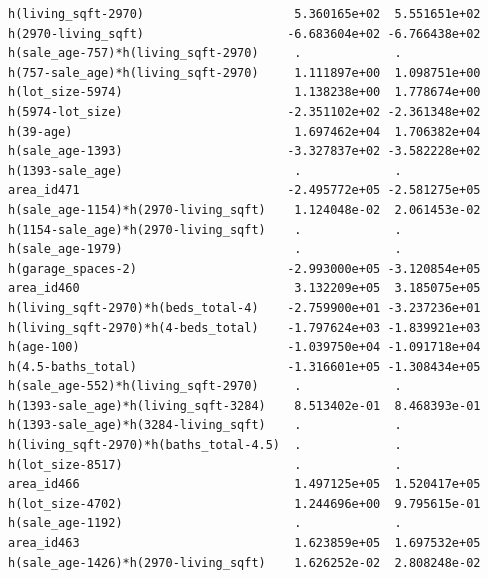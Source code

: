 \documentclass[
]{article}
\begin{document}
\begin{verbatim}
h(living_sqft-2970)                     5.360165e+02  5.551651e+02
h(2970-living_sqft)                    -6.683604e+02 -6.766438e+02
h(sale_age-757)*h(living_sqft-2970)     .             .           
h(757-sale_age)*h(living_sqft-2970)     1.111897e+00  1.098751e+00
h(lot_size-5974)                        1.138238e+00  1.778674e+00
h(5974-lot_size)                       -2.351102e+02 -2.361348e+02
h(39-age)                               1.697462e+04  1.706382e+04
h(sale_age-1393)                       -3.327837e+02 -3.582228e+02
h(1393-sale_age)                        .             .           
area_id471                             -2.495772e+05 -2.581275e+05
h(sale_age-1154)*h(2970-living_sqft)    1.124048e-02  2.061453e-02
h(1154-sale_age)*h(2970-living_sqft)    .             .           
h(sale_age-1979)                        .             .           
h(garage_spaces-2)                     -2.993000e+05 -3.120854e+05
area_id460                              3.132209e+05  3.185075e+05
h(living_sqft-2970)*h(beds_total-4)    -2.759900e+01 -3.237236e+01
h(living_sqft-2970)*h(4-beds_total)    -1.797624e+03 -1.839921e+03
h(age-100)                             -1.039750e+04 -1.091718e+04
h(4.5-baths_total)                     -1.316601e+05 -1.308434e+05
h(sale_age-552)*h(living_sqft-2970)     .             .           
h(1393-sale_age)*h(living_sqft-3284)    8.513402e-01  8.468393e-01
h(1393-sale_age)*h(3284-living_sqft)    .             .           
h(living_sqft-2970)*h(baths_total-4.5)  .             .           
h(lot_size-8517)                        .             .           
area_id466                              1.497125e+05  1.520417e+05
h(lot_size-4702)                        1.244696e+00  9.795615e-01
h(sale_age-1192)                        .             .           
area_id463                              1.623859e+05  1.697532e+05
h(sale_age-1426)*h(2970-living_sqft)    1.626252e-02  2.808248e-02
                                                                  

\end{verbatim}
\end{document}
